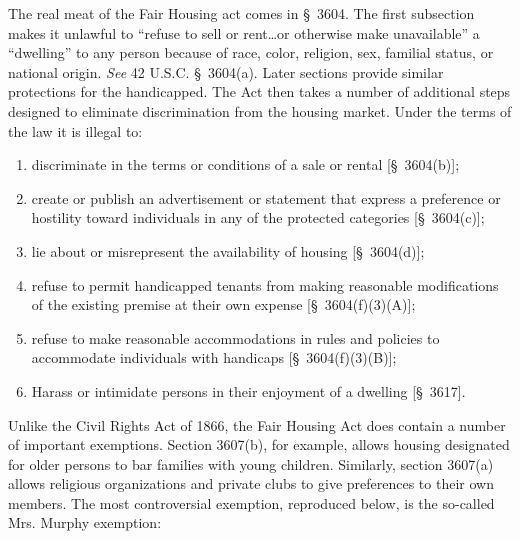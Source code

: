 The real meat of the Fair Housing act comes in \S~3604.  The first subsection
makes it unlawful to ``refuse to sell or rent\ldots or otherwise make
unavailable'' a ``dwelling'' to any person because of race, color, religion,
sex, familial status, or national origin. \textit{See} 42 U.S.C. \S~3604(a). 
Later sections provide similar protections for the handicapped.  The Act then
takes a number of additional steps designed to eliminate discrimination from
the housing market.  Under the terms of the law it is illegal to:
\begin{enumerate}
\item discriminate in the terms or conditions of a sale or rental [\S~3604(b)];

\item create or publish an advertisement or statement that express a preference
or hostility toward individuals in any of the protected categories
[\S~3604(c)];
\item  lie about or misrepresent the availability of housing [\S~3604(d)];
\item refuse to permit handicapped tenants from making reasonable modifications
of the existing premise at their own expense [\S~3604(f)(3)(A)];
\item refuse to make reasonable accommodations in rules and policies to
accommodate individuals with handicaps [\S~3604(f)(3)(B)];
\item Harass or intimidate persons in their enjoyment of a dwelling [\S~3617]. 
\end{enumerate}
Unlike the Civil Rights Act of 1866, the Fair Housing Act does contain a number
of important exemptions. Section 3607(b), for example, allows housing
designated for older persons to bar families with young children.  Similarly,
section 3607(a) allows religious organizations and private clubs to give
preferences to their own members.  The most controversial exemption, reproduced
below, is the so-called Mrs. Murphy exemption:
